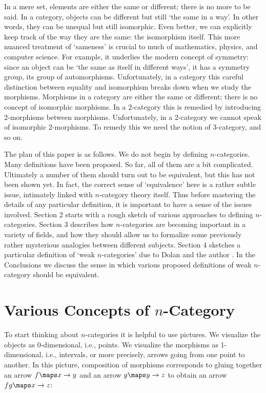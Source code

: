 In a mere set, elements are either the same or different; there is no
more to be said.  In a category, objects can be different but still `the
same in a way'.  In other words, they can be unequal but still
isomorphic.  Even better, we can explicitly keep track of the way they
are the same: the isomorphism itself.  This more nuanced treatment of
`sameness' is crucial to much of mathematics, physics, and computer
science.  For example, it underlies the modern concept of symmetry:
since an object can be `the same as itself in different ways', it has a
symmetry group, its group of automorphisms.  Unfortunately, in a
category this careful distinction between equality and isomorphism
breaks down when we study the morphisms.  Morphisms in a category are
either the same or different; there is no concept of isomorphic
morphisms.  In a 2-category this is remedied by introducing 2-morphisms
between morphisms.  Unfortunately, in a 2-category we cannot speak of
isomorphic 2-morphisms.  To remedy this we need the notion of
3-category, and so on.

The plan of this paper is as follows.  We do not begin by defining
$n$-categories.  Many definitions have been proposed.  So far, all of
them are a bit complicated.  Ultimately a number of them should turn out
to be equivalent, but this has not been shown yet.  In fact, the correct
sense of `equivalence' here is a rather subtle issue, intimately linked
with $n$-category theory itself.  Thus before mastering the details of
any particular definition, it is important to have a sense of the issues
involved.  Section 2 starts with a rough sketch of various approaches to
defining $n$-categories.  Section 3 describes how $n$-categories are
becoming important in a variety of fields, and how they should allow us
to formalize some previously rather mysterious analogies between
different subjects.  Section 4 sketches a particular definition of `weak
$n$-categories' due to Dolan and the author \cite{BD2}.  In the Conclusions
we discuss the sense in which various proposed definitions of 
weak $n$-category should be equivalent.

\section{Various Concepts of $n$-Category}

To start thinking about $n$-categories it is helpful to use pictures. 
We visualize the objects as 0-dimensional, i.e., points.  We
visualize the morphisms as 1-dimensional, i.e., intervals, or
more precisely, arrows going from one point to another.  In this picture,
composition of morphisms corresponds to gluing together an arrow
$f \maps x \to y$ and an arrow $g \maps y \to z$ to obtain an arrow
$fg \maps x \to z$:


